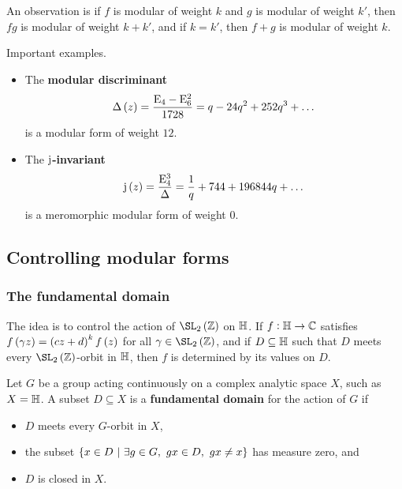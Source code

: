 
An observation is if $ f $ is modular of weight $ k $ and $ g $ is modular of weight $ k' $, then $ fg $ is modular of weight $ k + k' $, and if $ k = k' $, then $ f + g $ is modular of weight $ k $.

\begin{example*}
Important examples.
\begin{itemize}
\item The \textbf{modular discriminant}
$$ \Delta\br{z} = \dfrac{\E_4 - \E_6^2}{1728} = q - 24q^2 + 252q^3 + \dots $$
is a modular form of weight $ 12 $.
\item The \textbf{$ \mathrm{j} $-invariant}
$$ \j\br{z} = \dfrac{\E_4^3}{\Delta} = \dfrac{1}{q} + 744 + 196844q + \dots $$
is a meromorphic modular form of weight $ 0 $.
\end{itemize}
\end{example*}

\pagebreak

\subsection{Controlling modular forms}

\subsubsection{The fundamental domain}

The idea is to control the action of $ \SL_2\br{\ZZ} $ on $ \mathbb{H} $. If $ f : \mathbb{H} \to \mathbb{C} $ satisfies $ f\br{\gamma z} = \br{cz + d}^kf\br{z} $ for all $ \gamma \in \SL_2\br{\ZZ} $, and if $ D \subseteq \mathbb{H} $ such that $ D $ meets every $ \SL_2\br{\ZZ} $-orbit in $ \mathbb{H} $, then $ f $ is determined by its values on $ D $.

\begin{definition}
Let $ G $ be a group acting continuously on a complex analytic space $ X $, such as $ X = \mathbb{H} $. A subset $ D \subseteq X $ is a \textbf{fundamental domain} for the action of $ G $ if
\begin{itemize}
\item $ D $ meets every $ G $-orbit in $ X $,
\item the subset $ \cbr{x \in D \st \exists g \in G, \ gx \in D, \ gx \ne x} $ has measure zero, and
\item $ D $ is closed in $ X $.
\end{itemize}
\end{definition}

